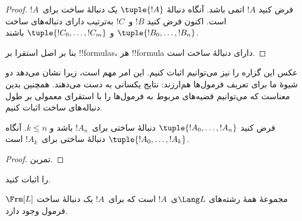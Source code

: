 \documentclass[../../../include/open-logic-section]{subfiles}
\begin{document}
\begin{proof}
فرض کنید $!A$ اتمی باشد. آنگاه دنبالهٔ $\tuple{!A}$ یک دنبالهٔ ساخت
برای~$!A$ است.
%
اکنون فرض کنید $!B$ و~$!C$ به‌ترتیب دارای دنباله‌های ساخت
$\tuple{!B_0,\dotsc,!B_n}$ و $\tuple{!C_0,\dotsc,!C_m}$ باشند.
%
\begin{enumerate}
\end{enumerate}
بنا بر اصل استقرا بر !!{formula}s، هر !!{formula} دارای دنبالهٔ ساخت است.
\end{proof}

عکس این گزاره را نیز می‌توانیم اثبات کنیم. این امر مهم است، زیرا نشان می‌دهد
دو شیوهٔ ما برای تعریف فرمول‌ها هم‌ارزند: نتایج یکسانی به دست می‌دهند. همچنین
بدین معناست که می‌توانیم قضیه‌های مربوط به فرمول‌ها را با استقرای معمولی بر
طول دنباله‌های ساخت اثبات کنیم.

\begin{lem}
فرض کنید $\tuple{!A_0,\dotsc,!A_n}$ دنبالهٔ ساختی برای~$!A_n$ باشد و
$k \leq n$. آنگاه $\tuple{!A_0,\dotsc,!A_k}$ دنبالهٔ ساختی
برای~$!A_k$ است.
\end{lem}

\begin{proof}
تمرین.
\end{proof}

\begin{prob}
 را اثبات کنید.
\end{prob}

\begin{thm}
$\Frm[L]$ مجموعهٔ همهٔ رشته‌های $\Lang L$ی~$!A$ است که برای~$!A$ یک
دنبالهٔ ساخت فرمول وجود دارد.
\end{thm}
\end{document}
